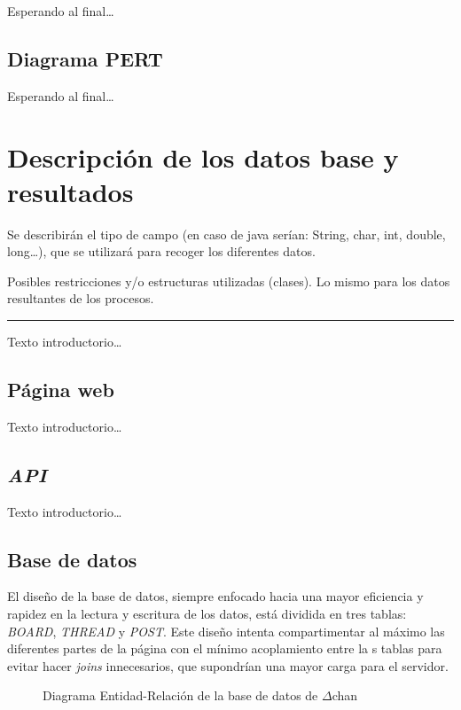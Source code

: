 \documentclass[12pt,a4paper,titlepage]{article}
\newcommand\projectname{$\Delta$chan}
\begin{document}
    Esperando al final\dots

    \subsection{Diagrama PERT}

    Esperando al final\dots

    \section{Descripción de los datos base y resultados}

    Se describirán el tipo de campo (en caso de java serían: String, char, int, double, long\dots), que se utilizará para recoger los diferentes datos.

    Posibles restricciones y/o estructuras utilizadas (clases). Lo mismo para los datos resultantes de los procesos.

    \bigskip\hrule\bigskip

    Texto introductorio\dots

    \subsection{Página web}

    Texto introductorio\dots

    \subsection{\textit{API}}

    Texto introductorio\dots

    \subsection{Base de datos}

    El diseño de la base de datos, siempre enfocado hacia una mayor eficiencia y rapidez en la lectura y escritura de los datos, está dividida en tres tablas: \textit{BOARD}, \textit{THREAD} y \textit{POST}. Este diseño intenta compartimentar al máximo las diferentes partes de la página con el mínimo acoplamiento entre la s tablas para evitar hacer \textit{joins} innecesarios, que supondrían una mayor carga para el servidor.

    \begin{figure}[ht]
        \centering
        \caption{Diagrama Entidad-Relación de la base de datos de \projectname}\bigskip
        \label{er:diagram}
    \end{figure}
\end{document}
